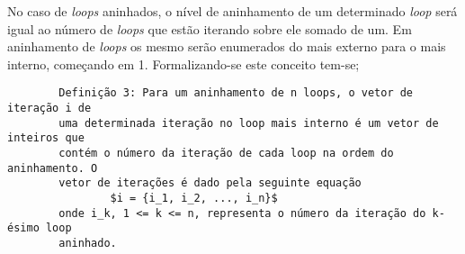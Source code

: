 No caso de \textit{loops} aninhados, o nível de aninhamento de um determinado 
\textit{loop} será igual ao número de \textit{loops} que estão iterando sobre
ele somado de um. Em aninhamento de \textit{loops} os mesmo serão enumerados do
mais externo para o mais interno, começando em 1. Formalizando-se este conceito
tem-se;

\begin{verbatim}
        Definição 3: Para um aninhamento de n loops, o vetor de iteração i de
        uma determinada iteração no loop mais interno é um vetor de inteiros que
        contém o número da iteração de cada loop na ordem do aninhamento. O
        vetor de iterações é dado pela seguinte equação
                $i = {i_1, i_2, ..., i_n}$
        onde i_k, 1 <= k <= n, representa o número da iteração do k-ésimo loop
        aninhado.
\end{verbatim}












